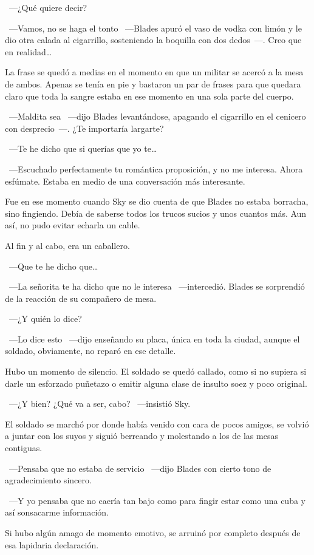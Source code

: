 ~---¿Qué quiere decir?

~---Vamos, no se haga el tonto ~---Blades apuró el vaso de vodka con limón y le dio otra calada al cigarrillo, sosteniendo la boquilla con dos dedos~---. Creo que en realidad\dots{}

La frase se quedó a medias en el momento en que un militar se acercó a la mesa de ambos. Apenas se tenía en pie y bastaron un par de frases para que quedara claro que toda la sangre estaba en ese momento en una sola parte del cuerpo.

~---Maldita sea ~---dijo Blades levantándose, apagando el cigarrillo en el cenicero con desprecio~---. ¿Te importaría largarte?

~---Te he dicho que si querías que yo te\dots{}

~---Escuchado perfectamente tu romántica proposición, y no me interesa. Ahora esfúmate. Estaba en medio de una conversación más interesante.

Fue en ese momento cuando Sky se dio cuenta de que Blades no estaba borracha, sino fingiendo. Debía de saberse todos los trucos sucios y unos cuantos más. Aun así, no pudo evitar echarla un cable.

Al fin y al cabo, era un caballero.

~---Que te he dicho que\dots{}

~---La señorita te ha dicho que no le interesa ~---intercedió. Blades se sorprendió de la reacción de su compañero de mesa.

~---¿Y quién lo dice?

~---Lo dice esto ~---dijo enseñando su placa, única en toda la ciudad, aunque el soldado, obviamente, no reparó en ese detalle.

Hubo un momento de silencio. El soldado se quedó callado, como si no supiera si darle un esforzado puñetazo o emitir alguna clase de insulto soez y poco original.

~---¿Y bien? ¿Qué va a ser, cabo? ~---insistió Sky.

El soldado se marchó por donde había venido con cara de pocos amigos, se volvió a juntar con los suyos y siguió berreando y molestando a los de las mesas contiguas.

~---Pensaba que no estaba de servicio ~---dijo Blades con cierto tono de agradecimiento sincero.

~---Y yo pensaba que no caería tan bajo como para fingir estar como una cuba y así sonsacarme información.

Si hubo algún amago de momento emotivo, se arruinó por completo después de esa lapidaria declaración.

